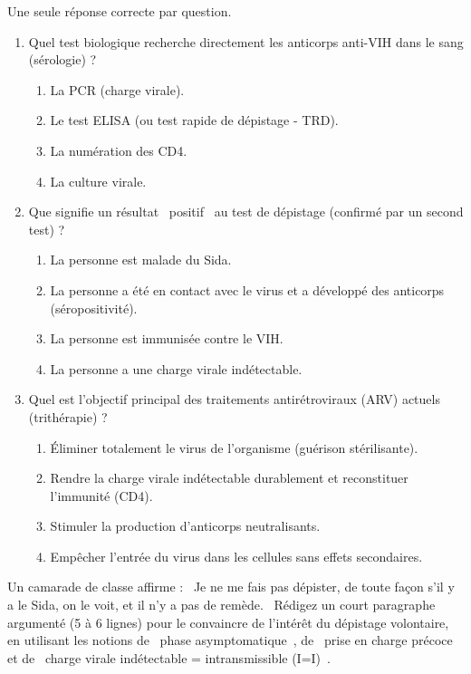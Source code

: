\documentclass[11pt]{article}
\begin{document}
\begin{exercice}
Une seule réponse correcte par question.
\begin{enumerate}
    \item Quel test biologique recherche directement les anticorps anti-VIH dans le sang (sérologie) ?
    \begin{enumerate}
        \item La PCR (charge virale).
        \item Le test ELISA (ou test rapide de dépistage - TRD).
        \item La numération des CD4.
        \item La culture virale.
    \end{enumerate}
    \item Que signifie un résultat \og~positif~\fg{} au test de dépistage (confirmé par un second test) ?
    \begin{enumerate}
        \item La personne est malade du Sida.
        \item La personne a été en contact avec le virus et a développé des anticorps (séropositivité).
        \item La personne est immunisée contre le VIH.
        \item La personne a une charge virale indétectable.
    \end{enumerate}
    \item Quel est l'objectif principal des traitements antirétroviraux (ARV) actuels (trithérapie) ?
    \begin{enumerate}
        \item Éliminer totalement le virus de l'organisme (guérison stérilisante).
        \item Rendre la charge virale indétectable durablement et reconstituer l'immunité (CD4).
        \item Stimuler la production d'anticorps neutralisants.
        \item Empêcher l'entrée du virus dans les cellules sans effets secondaires.
    \end{enumerate}
\end{enumerate}
\end{exercice}

\begin{exercice}
Un camarade de classe affirme : \og~Je ne me fais pas dépister, de toute façon s'il y a le Sida, on le voit, et il n'y a pas de remède.~\fg{}
Rédigez un court paragraphe argumenté (5 à 6 lignes) pour le convaincre de l'intérêt du dépistage volontaire, en utilisant les notions de \og~phase asymptomatique~\fg{}, de \og~prise en charge précoce~\fg{} et de \og~charge virale indétectable = intransmissible (I=I)~\fg{}.
\end{exercice}
\end{document}
